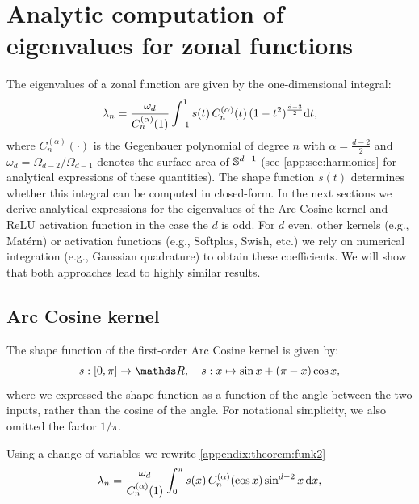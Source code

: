 
\chapter{Analytic computation of eigenvalues for zonal functions}
\label{app:sec:compute-eigenvalues}


The eigenvalues of a zonal function are given by the one-dimensional integral:
\begin{equation}
    \label{appendix:theorem:funk2}
    \lambda_{n} = 
   \frac{\omega_{d}}{C_n^{(\alpha)}(1)} \int_{-1}^1 s(t)\,C_n^{(\alpha)}(t)\,(1 - t^2)^{\frac{d-3}{2}} \mathrm{d}{t},
\end{equation}
where $C_n^{(\alpha)}(\cdot)$ is the Gegenbauer polynomial of degree $n$ with $\alpha = \frac{d-2}{2}$ and $\omega_{d} = \Omega_{d-2} / \Omega_{d-1}$ denotes the surface area of $\mathbb{S}^{d-1}$ (see \cref{app:sec:harmonics} for analytical expressions of these quantities). The shape function $s(t)$ determines whether this integral can be computed in closed-form. In the next sections we derive analytical expressions for the eigenvalues of the Arc Cosine kernel and ReLU activation function in the case the $d$ is odd. For $d$ even, other kernels (e.g., Mat\'ern) or activation functions (e.g., Softplus, Swish, etc.) we rely on numerical integration (e.g., Gaussian quadrature) to obtain these coefficients. We will show that both approaches lead to highly similar results.

\section{Arc Cosine kernel}
\label{sec:appendix:compute-eigenvalues-arccosine}

The shape function of the first-order Arc Cosine kernel \citep{cho2009kernel} is given by:
\begin{equation}
    s:[0, \pi] \rightarrow \Reals,\quad s: x \mapsto \sin x + (\pi - x) \cos x,
\end{equation}
where we expressed the shape function as a function of the angle between the two inputs, rather than the cosine of the angle. For notational simplicity, we also omitted the factor $1 / \pi$.

Using a change of variables we rewrite \cref{appendix:theorem:funk2}
\begin{equation}
    \lambda_n
    =  \frac{\omega_{d}}{C_n^{(\alpha)}(1)}  \int_{0}^\pi s(x)\,C_n^{(\alpha)}(\cos x) \sin^{d-2} x\,\mathrm{d}{x},
\end{equation}


